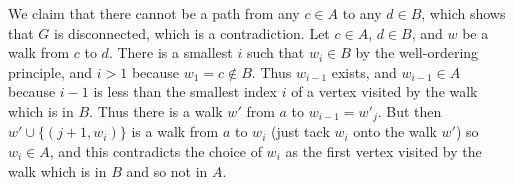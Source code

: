 \documentclass[12pt]{article}
\begin{document}
\begin{description}
We claim that there cannot be a path from any $c \in A$ to any $d \in B$, which shows that $G$ is disconnected, which is a contradiction.  Let $c \in A$, $d \in B$, and $w$ be a walk from $c$ to $d$.  There is a smallest $i$ such
that $w_i \in B$ by the well-ordering principle, and $i>1$ because $w_1 = c \not\in B$.  Thus $w_{i-1}$ exists,
and $w_{i-1} \in A$ because $i-1$ is less than the smallest index $i$ of a vertex visited by the walk which is in $B$.
Thus there is a walk $w'$ from $a$ to $w_{i-1} = w'_j$.  But then $w' \cup \{(j+1,w_i)\}$ is a walk from $a$ to $w_i$
(just tack $w_i$ onto the walk $w'$) so $w_i \in A$, and this contradicts the choice of $w_i$ as the first vertex visited by the walk which is in $B$ and so not in $A$.

\end{description}
\end{document}
